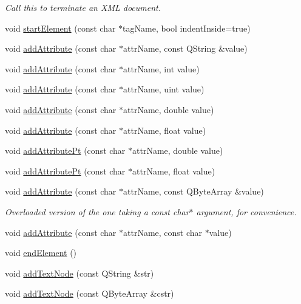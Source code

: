 \begin{CompactItemize}
\begin{CompactList}\small\item\em Call this to terminate an XML document. \item\end{CompactList}\item 
void \hyperlink{classKoXmlWriter_38a32e955d59b3e321914320ec4f2aea}{startElement} (const char $\ast$tagName, bool indentInside=true)
\item 
void \hyperlink{classKoXmlWriter_dbe177678ee94042b4fd352245e625c6}{addAttribute} (const char $\ast$attrName, const QString \&value)
\item 
void \hyperlink{classKoXmlWriter_fa11b5f1fed349624106280436ca7fb5}{addAttribute} (const char $\ast$attrName, int value)
\item 
void \hyperlink{classKoXmlWriter_e3103a2a23b5a037272ccae9a378d5d2}{addAttribute} (const char $\ast$attrName, uint value)
\item 
void \hyperlink{classKoXmlWriter_70f154aa14a29bfedc6fc8a8db65274d}{addAttribute} (const char $\ast$attrName, double value)
\item 
void \hyperlink{classKoXmlWriter_f824c78438951baaad9c79cf7c1267a7}{addAttribute} (const char $\ast$attrName, float value)
\item 
void \hyperlink{classKoXmlWriter_59281d5370c489c60515726e0b38ccd0}{addAttributePt} (const char $\ast$attrName, double value)
\item 
void \hyperlink{classKoXmlWriter_09a850bdbc2da6652e370508d03c6395}{addAttributePt} (const char $\ast$attrName, float value)
\item 
\hypertarget{classKoXmlWriter_146659f6c925adc68b2f2b66dccf7ac5}{
void \hyperlink{classKoXmlWriter_146659f6c925adc68b2f2b66dccf7ac5}{addAttribute} (const char $\ast$attrName, const QByteArray \&value)}
\label{classKoXmlWriter_146659f6c925adc68b2f2b66dccf7ac5}

\begin{CompactList}\small\item\em Overloaded version of the one taking a const char$\ast$ argument, for convenience. \item\end{CompactList}\item 
void \hyperlink{classKoXmlWriter_920571457da436ac3c6e7f8f0521e48c}{addAttribute} (const char $\ast$attrName, const char $\ast$value)
\item 
void \hyperlink{classKoXmlWriter_c0c62332ed7c5011e8c8edd9c26019a0}{endElement} ()
\item 
void \hyperlink{classKoXmlWriter_abee3ed993fcc913c3466083627843fc}{addTextNode} (const QString \&str)
\item 
\hypertarget{classKoXmlWriter_20e11dad38641d11bd1eac2f520700d3}{
void \hyperlink{classKoXmlWriter_20e11dad38641d11bd1eac2f520700d3}{addTextNode} (const QByteArray \&cstr)}
\label{classKoXmlWriter_20e11dad38641d11bd1eac2f520700d3}


\end{CompactItemize}
